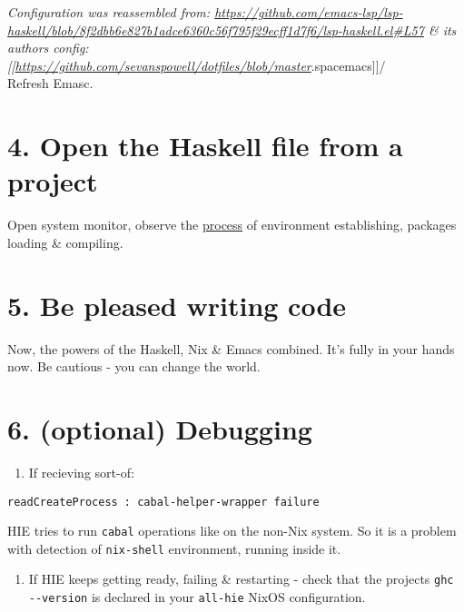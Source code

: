 \documentclass[a4paper,14pt,oneside]{book}
\begin{document}
\emph{Configuration was reassembled from: \url{https://github.com/emacs-lsp/lsp-haskell/blob/8f2dbb6e827b1adce6360c56f795f29ecff1d7f6/lsp-haskell.el\#L57} \& its authors config: [[\url{https://github.com/sevanspowell/dotfiles/blob/master}}.spacemacs]]/\\

Refresh Emasc.\\

\section{4. Open the Haskell file from a project}
\label{sec:orgc628213}

Open system monitor, observe the \hyperref[orgd8bff94]{process} of environment establishing, packages loading \& compiling.\\

\section{5. Be pleased writing code}
\label{sec:org69e209e}

Now, the powers of the Haskell, Nix \& Emacs combined. It's fully in your hands now. Be cautious - you can change the world.\\

\section{6. (optional) Debugging}
\label{sec:org4108113}

\begin{enumerate}
\item If recieving sort-of:\\
\end{enumerate}

\begin{verbatim}
readCreateProcess : cabal-helper-wrapper failure
\end{verbatim}

HIE tries to run \texttt{cabal} operations like on the non-Nix system. So it is a problem with detection of \texttt{nix-shell} environment, running inside it.\\

\begin{enumerate}
\item If HIE keeps getting ready, failing \& restarting - check that the projects \texttt{ghc -{}-version} is declared in your \texttt{all-hie} NixOS configuration.\\
\end{enumerate}
\end{document}
